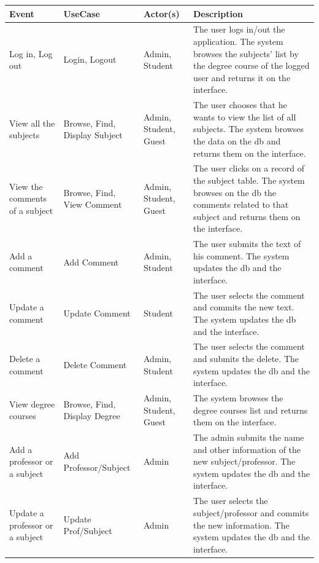 \documentclass[a4paper]{article}
\begin{document}
\begin{table}[h]
\centering
\begin{tabular}{p{}p{}p{}p{}}
\hline
\textbf{Event} & \textbf{UseCase} & \textbf{Actor(s)} & \textbf{Description}\\ \hline

Log in, Log out & Login,  Logout & Admin, Student & The user logs in/out the application. The system browses the subjects' list by the degree course of the logged user and returns it on the interface.\\ \hline

View all the subjects & Browse, Find, Display Subject & Admin, Student, Guest & The user chooses that he wants to view the list of all subjects. The system browses the data on the db and returns them on the interface.\\ \hline

View the comments of a subject & Browse, Find, View Comment & Admin, Student, Guest & The user clicks on a record of the subject table. The system browses on the db the comments related to that subject and returns them on the interface.\\ \hline

Add a comment & Add Comment & Admin, Student & The user submits the text of his comment. The system updates the db and the interface.\\ \hline

Update a comment & Update Comment & Student & The user selects the comment and commits the new text. The system updates the db and the interface.\\ \hline

Delete a comment & Delete Comment & Admin, Student & The user selects the comment and submits the delete. The system updates the db and the interface.\\ \hline

View degree courses & Browse, Find, Display Degree & Admin, Student, Guest & The system browses the degree courses list and returns them on the interface.\\ \hline

Add a professor or a subject & Add Professor/Subject & Admin & The admin submits the name and other information of the new subject/professor. The system updates the db and the interface.\\ \hline

Update a professor or a subject & Update Prof/Subject & Admin & The user selects the subject/professor and commits the new information. The system updates the db and the interface.\\ \hline


\end{tabular}
\end{table}
\end{document}
